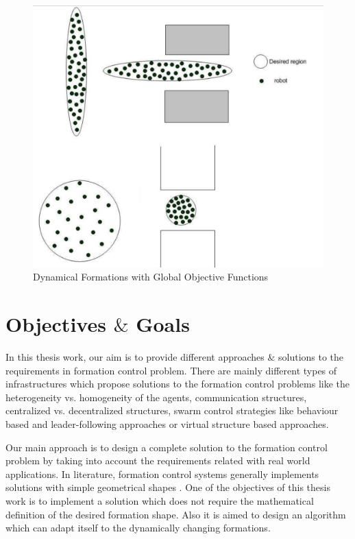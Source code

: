 \begin{figure}[H]
\caption{Dynamical Formations with Global Objective Functions \cite{8}}
\centering
\includegraphics[scale = 0.32]{houslotine}
\end{figure}


\section{Objectives $\&$ Goals} \label{Objectives}
In this thesis work, our aim is to provide different approaches $\&$ solutions to the requirements in formation control problem.  There are mainly different types of  infrastructures which propose solutions to the formation control problems like the heterogeneity vs. homogeneity of the agents, communication structures, centralized vs. decentralized structures, swarm control strategies like behaviour based and leader-following approaches or virtual structure based approaches. 

Our main approach is to design a complete solution to the formation control problem by taking into account the requirements related with real world applications. In literature, formation control systems generally implements solutions with simple geometrical shapes \cite{8}. One of the objectives of this thesis work is to implement a solution which does not require the mathematical definition of the desired formation shape. Also it is aimed to design an algorithm which can adapt itself to the dynamically changing formations.

